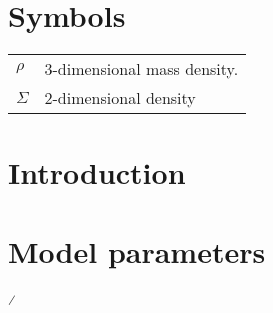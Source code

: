 \documentclass[12pt,oneside,letterpaper]{report}
\begin{document}

\tableofcontents
\listoffigures
\listoftables

\chapter*{Symbols}


\setlength{\tabcolsep}{0pt}
\begin{longtable}{p{} p{}}
$\rho$ & 3-dimensional mass density. \\

$\Sigma$ & 2-dimensional density \\
\end{longtable}

\setlength{\tabcolsep}{6pt}
\renewcommand*{\arraystretch}{1}


\printglossary[type=\acronymtype,nonumberlist]
\printglossary


\newpage






\chapter{Introduction}




\the\textwidth


\newpage

 



\appendix
% 



\chapter{Model parameters}\label{sec:jack}




⁄
\end{document}
